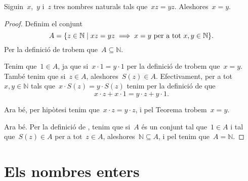 \documentclass[../../main.tex]{subfiles}
\begin{document}
    \begin{theorem}
        \label{thm:podem tatxar pel producte nombres naturals}
        Siguin~\(x\),~\(y\) i~\(z\) tres nombres naturals tals que~\(xz=yz\).
        Aleshores~\(x=y\).
        \begin{proof}
            Definim el conjunt
            \[
                A=\{z\in\mathbb{N}\mid xz=yz\implies x=y\text{ per a tot }x,y\in\mathbb{N}\}.
            \]
            Per la definició de  trobem que~\(A\subseteq\mathbb{N}\).

            Tenim que~\(1\in A\), ja que si~\(x\cdot1=y\cdot1\) per la definició de  trobem que~\(x=y\).
            També tenim que si~\(z\in A\), aleshores~\(S(z)\in A\).
            Efectivament, per a tot~\(x,y\in\mathbb{N}\) tals que~\(x\cdot S(z)=y\cdot S(z)\) tenim per la definició de  que
            \[
                x\cdot z+x\cdot1=y\cdot z+y\cdot1.
            \]

            Ara bé, per hipòtesi tenim que~\(x\cdot z=y\cdot z\), i pel Teorema  trobem~\(x=y\).

            Ara bé.
            Per la definició de , tenim que si~\(A\) és un conjunt tal que~\(1\in A\) i tal que~\(S(z)\in A\) per a tot~\(z\in A\), aleshores~\(\mathbb{N}\subseteq A\), i pel  tenim que~\(A=\mathbb{N}\).
        \end{proof}
    \end{theorem}
\section{Els nombres enters}
\end{document}

